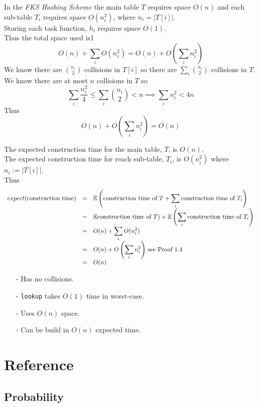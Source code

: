 \documentclass[11pt,a4paper]{article}
\begin{document}
In the \textit{FKS Hashing Scheme} the main table $T$ requires space $O(n)$ and each sub-table $T_i$ requires space $O(n_i^2)$, where $n_i=|T[i]|$.\\
Storing each task function, $h_i$ requires space $O(1)$.\\
Thus the total space used is1
$$O(n)+\sum_iO(n_i^2)=O(n)+O\left(\sum_in_i^2\right)$$
We know there are ${n_i\choose 2}$ collisions in $T[i]$ so there are $\sum_i{n_i\choose 2}$ collisions in $T$.\\
We know there are at most $n$ collisions in $T$ so
$$\sum_i\frac{n_i^2}{4}\leq\sum_i{n_i\choose2}<n\implies\sum_in_i^2<4n$$
Thus
$$O(n)+O\left(\sum_in_i^2\right)=O(n)$$

The expected construction time for the main table, $T$, is $O(n)$.\\
The expected construction time for reach sub-table, $T_i$, is $O(n_i^2)$ where $n_i:=|T[i]|$.\\
Thus
\[\begin{array}{rcl}
expect(\text{construction time})&=&{\displaystyle\mathbb{E}\left(\text{construction time of }T+\sum_i\text{construction time of }T_i\right)}\\
&=&\mathbb{E}\text{construction time of }T)+{\displaystyle\mathbb{E}\left(\sum_i\text{construction time of }T_i\right)}\\
&=&O(n)+{\displaystyle\sum_iO(n_i^2)}\\
&=&O(n)+{\displaystyle O\left(\sum_in_i^2\right)}\text{ see Proof 1.4}\\
&=&O(n)
\end{array}\]

\begin{itemize}
	\item[-] Has no collisions.
	\item[-] \lstinline!lookup! takes $O(1)$ time in worst-case.
	\item[-] Uses $O(n)$ space.
	\item[-] Can be build in $O(n)$ expected time.
\end{itemize}

\newpage
\setcounter{section}{-1}
\section{Reference}

\subsection{Probability}
\end{document}
